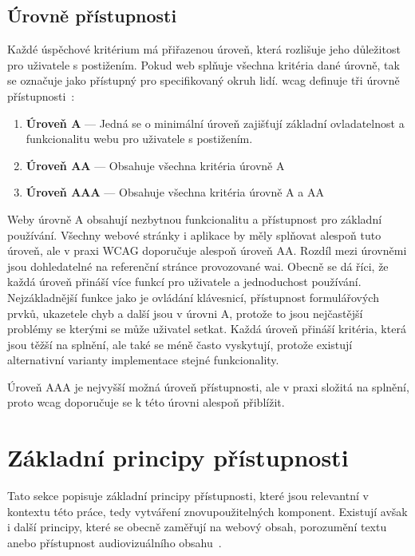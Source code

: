\subsection{Úrovně přístupnosti}

Každé úspěchové kritérium má přiřazenou úroveň, která rozlišuje jeho důležitost pro uživatele s postižením.
Pokud web splňuje všechna kritéria dané úrovně, tak se označuje jako přístupný pro specifikovaný okruh lidí.
\gls{wcag} definuje tři úrovně přístupnosti~\cite[Sekce 5.2.1]{wcag}:

\begin{enumerate}
  \item \textbf{Úroveň A} --- Jedná se o minimální úroveň zajišťují základní ovladatelnost a funkcionalitu webu pro uživatele s postižením.
  \item \textbf{Úroveň AA} --- Obsahuje všechna kritéria úrovně A
  \item \textbf{Úroveň AAA} --- Obsahuje všechna kritéria úrovně A a AA
\end{enumerate}

Weby úrovně A obsahují nezbytnou funkcionalitu a přístupnost pro základní používání.
Všechny webové stránky i aplikace by měly splňovat alespoň tuto úroveň, ale v praxi WCAG doporučuje alespoň úroveň AA.
Rozdíl mezi úrovněmi jsou dohledatelné na referenční stránce provozované \gls{wai}.
Obecně se dá říci, že každá úroveň přináší více funkcí pro uživatele a jednoduchost používání.
Nejzákladnější funkce jako je ovládání klávesnicí, přístupnost formulářových prvků, ukazetele chyb a další jsou v úrovni A, protože to jsou nejčastější problémy se kterými se může uživatel setkat.
Každá úroveň přináší kritéria, která jsou těžší na splnění, ale také se méně často vyskytují, protože existují alternativní varianty implementace stejné funkcionality.

Úroveň AAA je nejvyšší možná úroveň přístupnosti, ale v praxi složitá na splnění, proto \gls{wcag} doporučuje se k této úrovni alespoň přiblížit.

\section{Základní principy přístupnosti}


Tato sekce popisuje základní principy přístupnosti, které jsou relevantní v kontextu této práce, tedy vytváření znovupoužitelných komponent.
Existují avšak i další principy, které se obecně zaměřují na webový obsah, porozumění textu anebo přístupnost audiovizuálního obsahu~\cite{w3-accessibility-principles}.

